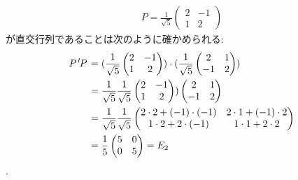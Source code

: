 \begin{checkanswer}%
  \begin{align*}
     P=\frac{1}{\sqrt{5}}
    \begin{pmatrix}
      2&-1\\
      1&2
    \end{pmatrix}
  \end{align*}
  が直交行列であることは次のように確かめられる:
  \begin{align*}
    P{\left.^{t}\!P\right.}
    &=
    (\frac{1}{\sqrt{5}}
    \begin{pmatrix}
      2&-1\\
      1&2
    \end{pmatrix})
    \cdot
    (\frac{1}{\sqrt{5}}
    \begin{pmatrix}
      2&1\\
      -1&2
    \end{pmatrix})\\
    &=
    \frac{1}{\sqrt{5}}\frac{1}{\sqrt{5}}
    \begin{pmatrix}
      2&-1\\
      1&2
    \end{pmatrix})
    \begin{pmatrix}
      2&1\\
      -1&2
    \end{pmatrix}\\
    &=
    \frac{1}{\sqrt{5}}\frac{1}{\sqrt{5}}
    \begin{pmatrix}
      2\cdot 2+(-1)\cdot(-1)&2\cdot 1+(-1)\cdot 2\\
      1\cdot 2+2\cdot(-1)&1\cdot 1+2\cdot 2
    \end{pmatrix}\\
   &=
    \frac{1}{5}
    \begin{pmatrix}
      5&0\\
      0&5
    \end{pmatrix}
   =E_2
  \end{align*}.
\end{checkanswer}


